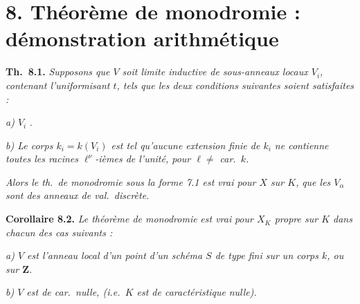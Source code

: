 \documentclass[11pt,a4paper]{article}
\begin{document}
\section{8. Théorème de monodromie : démonstration arithmétique}

\textbf{Th.\ 8.1.} \emph{Supposons que $V$ soit limite inductive  de sous-anneaux locaux $V_{i}$,}   \emph{contenant l'uniformisant $t$, tels que les deux conditions suivantes soient satisfaites :}

\emph{a)  $V_{i}$  }  .

\emph{b) Le corps  $k_{i} = k(V_{i})$ est tel qu'aucune extension finie de $k_{i}$ ne contienne toutes les racines $\ell^{\nu}$-ièmes de l'unité, pour $\ell \neq$ car.\ $k$.}

\emph{Alors le th.\ de monodromie \struck{\ill{}} sous la forme 7.1 est vrai pour \struck{\ill{}}   $X$ \struck{\ill{}} sur $K$,}     \emph{ que les $V_{\alpha}$ sont des anneaux de val.\ discrète.}

\textbf{Corollaire 8.2.} \emph{Le théorème de monodromie}  \emph{est vrai}    \emph{pour $X_{K}$ propre sur $K$ dans \struck{\ill{}} chacun des cas suivants :}

\emph{a) $V$ est  l'anneau local d'un point d'un schéma $S$ de type fini sur un  corps $k$, ou sur  $\mathbf{Z}$.}

\emph{b) $V$ est de car.\ nulle, (i.e.\ $K$ est de caractéristique}  \emph{nulle).}
\end{document}
